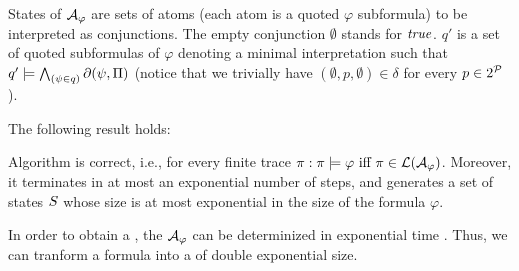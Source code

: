  States of $\mathcal{A}_\varphi$ are sets of atoms (each atom is a quoted $\varphi$ subformula) to be interpreted as conjunctions. The empty conjunction $\emptyset$ stands for $\mathit{true}$. $q'$ is a set of quoted subformulas of $\varphi$ denoting a minimal interpretation such that $q' \models \bigwedge_{(\psi\in q)} \partial\lparen \psi,\Pi \rparen$ (notice that we trivially have $(\emptyset, p,\emptyset) \in \delta$ for every $p \in 2^{\mathcal{P}}$).

The following result holds:
\begin{theorem}\label{ldlf2nfa-correctness}
	Algorithm \LDLfToNFA is correct, i.e., for every finite trace $\pi: \pi \models \varphi \ \text{iff}\  \pi \in \mathcal{L}(\mathcal{A}_\varphi)$. Moreover, it terminates in at most an exponential number of steps, and generates a set of states $S$ whose size is at most exponential in the size of the formula $\varphi$.
	
\end{theorem}

In order to obtain a \DFA, the \NFA $\mathcal{A}_\varphi$ can be determinized in exponential time \citep{Rabin:1959:FAD:1661907.1661909}. Thus, we can tranform a \LLf formula into a \DFA of double exponential size.


